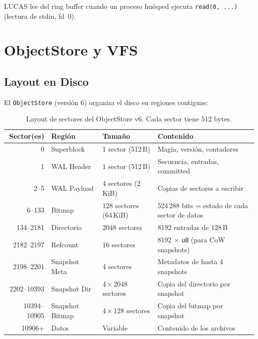 \documentclass[11pt,twoside,openright]{book}
\theoremstyle{definition}
\theoremstyle{plain}
\theoremstyle{remark}
\begin{document}
LUCAS lee del ring buffer cuando un proceso huésped ejecuta \texttt{read(0, ...)}
(lectura de stdin, fd~0).

\section{ObjectStore y VFS}
\label{sec:objstore}

\subsection{Layout en Disco}

El \texttt{ObjectStore} (versión 6) organiza el disco en regiones contiguas:

\begin{table}[ht]
\centering
\caption{Layout de sectores del ObjectStore v6. Cada sector tiene 512 bytes.}
\label{tab:objstore-layout}
\begin{tabular}{@{}rlll@{}}
\toprule
\textbf{Sector(es)} & \textbf{Región} & \textbf{Tamaño} & \textbf{Contenido} \\
\midrule
0          & Superblock        & 1 sector (512\,B)   & Magia, versión, contadores \\
1          & WAL Header        & 1 sector (512\,B)   & Secuencia, entradas, committed \\
2--5       & WAL Payload       & 4 sectores (2\,KiB) & Copias de sectores a escribir \\
6--133     & Bitmap            & 128 sectores (64\,KiB) & 524\,288 bits = estado de cada sector de datos \\
134--2181  & Directorio        & 2048 sectores       & 8192 entradas de 128\,B \\
2182--2197 & Refcount          & 16 sectores         & 8192 $\times$ \texttt{u8} (para CoW snapshots) \\
2198--2201 & Snapshot Meta     & 4 sectores          & Metadatos de hasta 4 snapshots \\
2202--10393 & Snapshot Dir     & $4 \times 2048$ sectores & Copia del directorio por snapshot \\
10394--10905 & Snapshot Bitmap & $4 \times 128$ sectores & Copia del bitmap por snapshot \\
10906+     & Datos             & Variable            & Contenido de los archivos \\
\bottomrule
\end{tabular}
\end{table}
\end{document}
